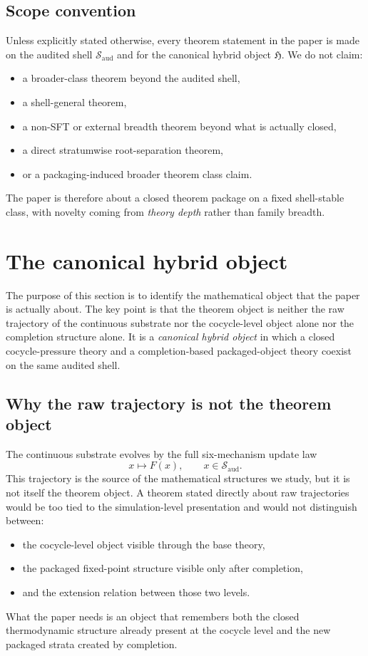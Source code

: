 \documentclass[11pt]{article}
\theoremstyle{definition}
\begin{document}
\subsection{Scope convention}

Unless explicitly stated otherwise, every theorem statement in the paper is made on the audited shell \(\mathcal{S}_{\mathrm{aud}}\) and for the canonical hybrid object \(\mathfrak{H}\). We do not claim:
\begin{itemize}
    \item a broader-class theorem beyond the audited shell,
    \item a shell-general theorem,
    \item a non-SFT or external breadth theorem beyond what is actually closed,
    \item a direct stratumwise root-separation theorem,
    \item or a packaging-induced broader theorem class claim.
\end{itemize}
The paper is therefore about a closed theorem package on a fixed shell-stable class, with novelty coming from \emph{theory depth} rather than family breadth.
 \section{The canonical hybrid object}\label{sec:canonical-object}

The purpose of this section is to identify the mathematical object that the paper is actually about. The key point is that the theorem object is neither the raw trajectory of the continuous substrate nor the cocycle-level object alone nor the completion structure alone. It is a \emph{canonical hybrid object} in which a closed cocycle-pressure theory and a completion-based packaged-object theory coexist on the same audited shell.

\subsection{Why the raw trajectory is not the theorem object}

The continuous substrate evolves by the full six-mechanism update law
\[
x\mapsto F(x), \qquad x\in \mathcal{S}_{\mathrm{aud}}.
\]
This trajectory is the source of the mathematical structures we study, but it is not itself the theorem object. A theorem stated directly about raw trajectories would be too tied to the simulation-level presentation and would not distinguish between:
\begin{itemize}
    \item the cocycle-level object visible through the base theory,
    \item the packaged fixed-point structure visible only after completion,
    \item and the extension relation between those two levels.
\end{itemize}
What the paper needs is an object that remembers both the closed thermodynamic structure already present at the cocycle level and the new packaged strata created by completion.
\end{document}
